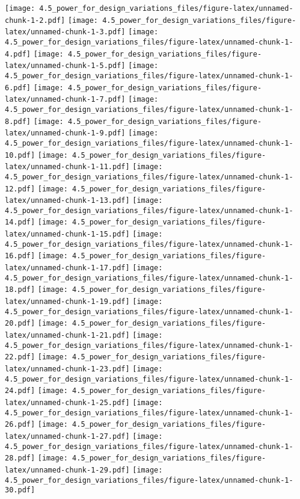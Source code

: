 \documentclass[]{article}
\begin{document}
\texttt{[image: 4.5\_power\_for\_design\_variations\_files/figure-latex/unnamed-chunk-1-2.pdf]}
\texttt{[image: 4.5\_power\_for\_design\_variations\_files/figure-latex/unnamed-chunk-1-3.pdf]}
\texttt{[image: 4.5\_power\_for\_design\_variations\_files/figure-latex/unnamed-chunk-1-4.pdf]}
\texttt{[image: 4.5\_power\_for\_design\_variations\_files/figure-latex/unnamed-chunk-1-5.pdf]}
\texttt{[image: 4.5\_power\_for\_design\_variations\_files/figure-latex/unnamed-chunk-1-6.pdf]}
\texttt{[image: 4.5\_power\_for\_design\_variations\_files/figure-latex/unnamed-chunk-1-7.pdf]}
\texttt{[image: 4.5\_power\_for\_design\_variations\_files/figure-latex/unnamed-chunk-1-8.pdf]}
\texttt{[image: 4.5\_power\_for\_design\_variations\_files/figure-latex/unnamed-chunk-1-9.pdf]}
\texttt{[image: 4.5\_power\_for\_design\_variations\_files/figure-latex/unnamed-chunk-1-10.pdf]}
\texttt{[image: 4.5\_power\_for\_design\_variations\_files/figure-latex/unnamed-chunk-1-11.pdf]}
\texttt{[image: 4.5\_power\_for\_design\_variations\_files/figure-latex/unnamed-chunk-1-12.pdf]}
\texttt{[image: 4.5\_power\_for\_design\_variations\_files/figure-latex/unnamed-chunk-1-13.pdf]}
\texttt{[image: 4.5\_power\_for\_design\_variations\_files/figure-latex/unnamed-chunk-1-14.pdf]}
\texttt{[image: 4.5\_power\_for\_design\_variations\_files/figure-latex/unnamed-chunk-1-15.pdf]}
\texttt{[image: 4.5\_power\_for\_design\_variations\_files/figure-latex/unnamed-chunk-1-16.pdf]}
\texttt{[image: 4.5\_power\_for\_design\_variations\_files/figure-latex/unnamed-chunk-1-17.pdf]}
\texttt{[image: 4.5\_power\_for\_design\_variations\_files/figure-latex/unnamed-chunk-1-18.pdf]}
\texttt{[image: 4.5\_power\_for\_design\_variations\_files/figure-latex/unnamed-chunk-1-19.pdf]}
\texttt{[image: 4.5\_power\_for\_design\_variations\_files/figure-latex/unnamed-chunk-1-20.pdf]}
\texttt{[image: 4.5\_power\_for\_design\_variations\_files/figure-latex/unnamed-chunk-1-21.pdf]}
\texttt{[image: 4.5\_power\_for\_design\_variations\_files/figure-latex/unnamed-chunk-1-22.pdf]}
\texttt{[image: 4.5\_power\_for\_design\_variations\_files/figure-latex/unnamed-chunk-1-23.pdf]}
\texttt{[image: 4.5\_power\_for\_design\_variations\_files/figure-latex/unnamed-chunk-1-24.pdf]}
\texttt{[image: 4.5\_power\_for\_design\_variations\_files/figure-latex/unnamed-chunk-1-25.pdf]}
\texttt{[image: 4.5\_power\_for\_design\_variations\_files/figure-latex/unnamed-chunk-1-26.pdf]}
\texttt{[image: 4.5\_power\_for\_design\_variations\_files/figure-latex/unnamed-chunk-1-27.pdf]}
\texttt{[image: 4.5\_power\_for\_design\_variations\_files/figure-latex/unnamed-chunk-1-28.pdf]}
\texttt{[image: 4.5\_power\_for\_design\_variations\_files/figure-latex/unnamed-chunk-1-29.pdf]}
\texttt{[image: 4.5\_power\_for\_design\_variations\_files/figure-latex/unnamed-chunk-1-30.pdf]}
\end{document}
